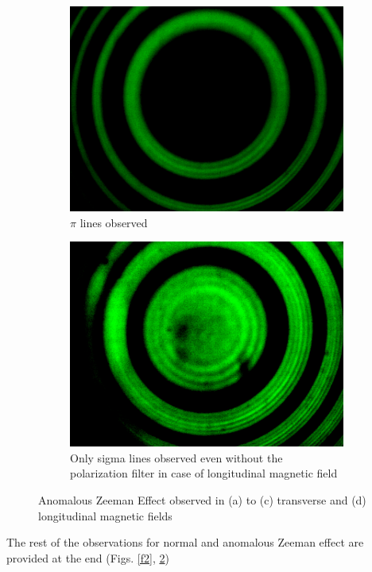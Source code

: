 \begin{figure}
\begin{subfigure}[b]{0.45\textwidth}
        \includegraphics[width=\textwidth]{images/pi.png}
        \caption{$\pi$ lines observed}
    \end{subfigure}\hfill
    \begin{subfigure}[b]{0.45\textwidth}
        \centering
        \includegraphics[width=\textwidth]{images/anomalous_longitudinal.png}
        \caption{Only sigma lines observed even without the polarization filter in case of longitudinal magnetic field}
        \label{ano_long}
    \end{subfigure}
    \caption{Anomalous Zeeman Effect observed in (a) to (c) transverse and (d) longitudinal magnetic fields}\label{f3}
\end{figure}
The rest of the observations for normal and anomalous Zeeman effect are provided at the end (Figs. \ref{f2}, \ref{f3})

